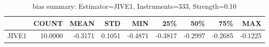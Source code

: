 \begin{table}[ht]
\centering
\caption{bias summary: Estimator=JIVE1, Instruments=333, Strength=0.10}
\begin{tabular}{lrrrrrrrr}
\toprule
 & COUNT & MEAN & STD & MIN & 25\% & 50\% & 75\% & MAX \\
\midrule
JIVE1 & 10.0000 & -0.3171 & 0.1051 & -0.4871 & -0.3817 & -0.2997 & -0.2685 & -0.1225 \\
\bottomrule
\end{tabular}
\end{table}
